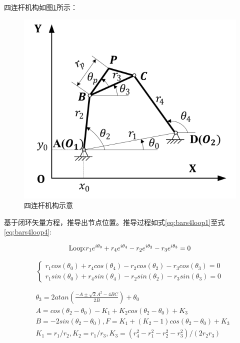 \documentclass[]{ctexbook}
\theoremstyle{definition}
\theoremstyle{definition}
\theoremstyle{definition}
\theoremstyle{remark}
\begin{document}
四连杆机构如图\ref{fig:fourbars}所示：

\begin{figure}

{\centering \includegraphics[width=0.7\linewidth]{img/bars4} 

}

\caption{四连杆机构示意}\label{fig:fourbars}
\end{figure}

基于闭环矢量方程，推导出节点位置。推导过程如式\eqref{eq:bars4loop1}至式\eqref{eq:bars4loop4}:

\begin{equation}
\mathbf{\text{Loop:}}   r_1e^{i\theta_0} + r_4e^{i\theta_4} - r_2e^{i\theta_2} -r_3e^{i\theta_3} = 0\\
\label{eq:bars4loop1}
\end{equation}

\begin{equation}
\begin{cases} 
r_1cos(\theta_0) + r_4cos(\theta_4)-r_2cos(\theta_2)-r_3cos(\theta_3)=0 \\ 
r_1sin(\theta_0) + r_4sin(\theta_4)-r_2sin(\theta_2)-r_3sin(\theta_3)=0
\end{cases}
\label{eq:bars4loop2}
\end{equation}

\begin{equation}
\begin{split}
&\theta_3 =2atan(\frac{-A\pm\sqrt{2}{A^2-4BC}}{2B})+\theta_0\\
&A = cos(\theta_2 - \theta_0)-K_1+K_2cos(\theta_2-\theta_0)+K_3\\
&B = -2sin(\theta_2-\theta_0), F=K_1+(K_2-1)cos(\theta_2-\theta_0)+K_3\\
&K_1 = r_1/r_2,K_2=r_1/r_3,K_3=(r_4^2-r_1^2-r_2^2-r_3^2)/(2r_2r_3)\\
\end{split}
\label{eq:bars4loop3}
\end{equation}
\end{document}
